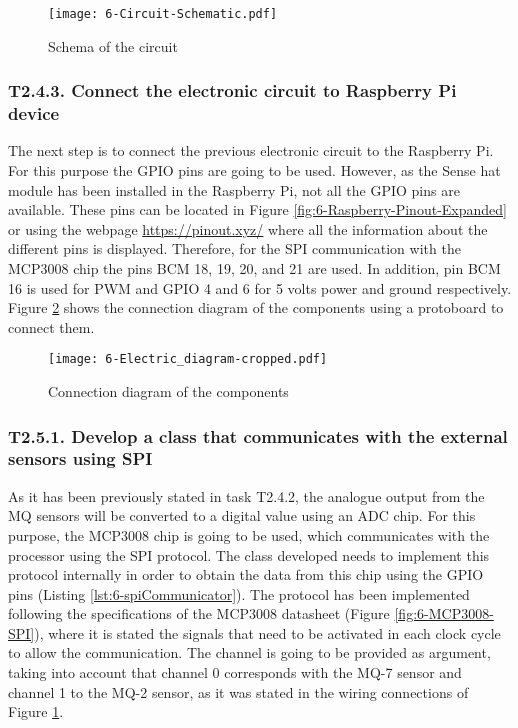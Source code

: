 \begin{figure}[!h]
	\begin{center}
		\texttt{[image: 6-Circuit-Schematic.pdf]}
		\caption{Schema of the circuit}
		\label{fig:6-Circuit-Schematic}
	\end{center}
\end{figure}




\subsubsection{T2.4.3. Connect the electronic circuit to Raspberry Pi device}
The next step is to connect the previous electronic circuit to the Raspberry Pi. For this purpose the GPIO pins are going to be used. However, as the Sense hat module has been installed in the Raspberry Pi, not all the GPIO pins are available. These pins can be located in Figure \ref{fig:6-Raspberry-Pinout-Expanded} or using the webpage \url{https://pinout.xyz/} where all the information about the different pins is displayed. Therefore, for the \ac{SPI} communication with the MCP3008 chip the pins BCM  18, 19, 20, and 21 are used. In addition, pin BCM 16 is used for \ac{PWM} and GPIO 4 and 6 for 5 volts power and ground respectively. Figure \ref{fig:6-Electric_diagram.pdf} shows the connection diagram of the components using a protoboard to connect them.

\begin{figure}[!h]
	\begin{center}
		\texttt{[image: 6-Electric\_diagram-cropped.pdf]}
		\caption{Connection diagram of the components}
		\label{fig:6-Electric_diagram.pdf}
	\end{center}
\end{figure}


\subsubsection{T2.5.1. Develop a class that communicates with the external sensors using \ac{SPI}}
As it has been previously stated in task T2.4.2, the analogue output from the MQ sensors will be converted to a digital value using an \ac{ADC} chip. For this purpose, the MCP3008 chip \cite{ADC} is going to be used, which communicates with the processor using the \ac{SPI} protocol. The class developed needs to implement this protocol internally in order to obtain the data from this chip using the GPIO pins (Listing \ref{lst:6-spiCommunicator}). The protocol has been implemented following the specifications of the MCP3008 datasheet (Figure \ref{fig:6-MCP3008-SPI}), where it is stated the signals that need to be activated in each clock cycle to allow the communication. The channel is going to be provided as argument, taking into account that channel 0 corresponds with the MQ-7 sensor and channel 1 to the MQ-2 sensor, as it was stated in the wiring connections of Figure \ref{fig:6-Circuit-Schematic}.

